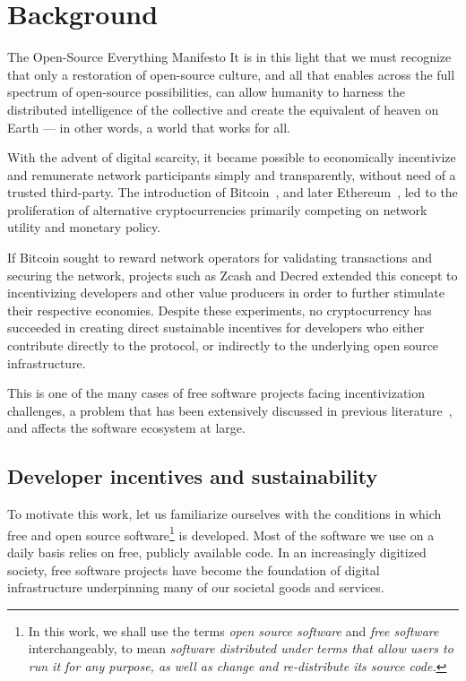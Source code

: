 \section{Background}

\begin{epigraph}{The Open-Source Everything Manifesto}
    \noindent It is in this light that we must recognize that only a restoration of
    open-source culture, and all that enables across the full spectrum of
    open-source possibilities, can allow humanity to harness the distributed
    intelligence of the collective and create the equivalent of heaven on Earth
    --- in other words, a world that works for all.
\end{epigraph}

\noindent With the advent of digital scarcity, it became possible to economically
incentivize and remunerate network participants simply and transparently,
without need of a trusted third-party. The introduction of
Bitcoin~\cite{bitcoin}, and later Ethereum~\cite{ethereum}, led to the
proliferation of alternative cryptocurrencies primarily competing on network
utility and monetary policy.

If Bitcoin sought to reward network operators for
validating transactions and securing the network, projects such as Zcash and
Decred extended this concept to incentivizing developers and other value producers
in order to further stimulate their respective economies. Despite these experiments,
no cryptocurrency has succeeded in creating direct sustainable incentives for
developers who either contribute directly to the protocol, or indirectly to the
underlying open source infrastructure.

This is one of the many cases of free software projects facing incentivization
challenges, a problem that has been extensively discussed in previous
literature~\cite{roads and bridges}, and affects the software ecosystem at large.

\subsection{Developer incentives and sustainability}
\label{s:incentives}

To motivate this work, let us familiarize ourselves with the
conditions in which free and open source software\footnote{In this work, we
shall use the terms \emph{open source software} and \emph{free software} interchangeably,
to mean \emph{software distributed under terms that allow users to run it
for any purpose, as well as change and re-distribute its source code.}}
is developed. Most of the software we use on a daily basis relies on free,
publicly available code. In an increasingly digitized society, free software
projects have become the foundation of digital infrastructure underpinning many
of our societal goods and services.

